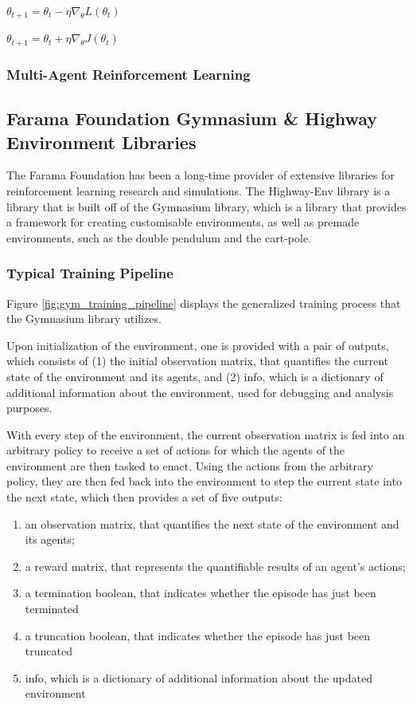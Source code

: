 \documentclass[12pt, a4paper]{report}
\begin{document}

$\theta_{t+1} = \theta_t - \eta \nabla_\theta L(\theta_t)$

$\theta_{t+1} = \theta_t + \eta \nabla_\theta J(\theta_t)$

\subsubsection{Multi-Agent Reinforcement Learning}

\subsection{Farama Foundation Gymnasium \& Highway Environment Libraries}

The Farama Foundation has been a long-time provider of extensive libraries for reinforcement learning research and simulations. The Highway-Env library is a library
that is built off of the Gymnasium library, which is a library that provides a framework for creating customisable environments, as well as premade environments, such as 
the double pendulum and the cart-pole.

\subsubsection{Typical Training Pipeline}

Figure \ref{fig:gym_training_pipeline} displays the generalized training process that the Gymnasium library utilizes.

Upon initialization of the environment, one is provided with a pair of outputs, which consists of (1) the initial observation matrix, that quantifies the current state of the environment and its agents, 
and (2) info, which is a dictionary of additional information about the environment, used for debugging and analysis purposes.

With every step of the environment, the current observation matrix is fed into an arbitrary policy to receive a set of actions for which the agents of the environment are then tasked to enact.
Using the actions from the arbitrary policy, they are then fed back into the environment to step the current state into the next state, which then provides a set of five outputs:

\begin{enumerate}
    \item an observation matrix, that quantifies the next state of the environment and its agents;
    \item a reward matrix, that represents the quantifiable results of an agent's actions;
    \item a termination boolean, that indicates whether the episode has just been terminated
    \item a truncation boolean, that indicates whether the episode has just been truncated
    \item info, which is a dictionary of additional information about the updated environment
\end{enumerate}
\end{document}

